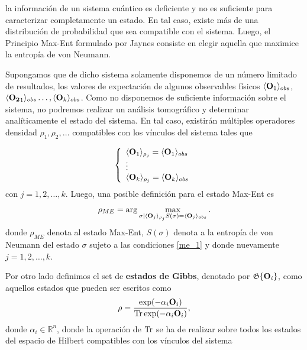 \documentclass{report} %
\newcommand{\lgg}{\langle}
\newcommand{\rgg}{\rangle}
\numberwithin{equation}{section}
\begin{document}
\begin{Omitir}
la información de un sistema cuántico es deficiente y no es suficiente para caracterizar completamente un estado. En tal caso, existe más de una distribución de probabilidad que sea compatible con el sistema. Luego, el Principio Max-Ent formulado por Jaynes consiste en elegir aquella que maximice la entropía de von Neumann.

Supongamos que de dicho sistema solamente disponemos de un número limitado de resultados, los valores de expectación de algunos observables físicos $\lgg {\bf O}_1 \rgg_{obs}$, $\lgg {\bf O_2}_1 \rgg_{obs} \ldots, \lgg {\bf O}_k \rgg_{obs}$. Como no disponemos de suficiente información sobre el sistema, no podremos realizar un análisis tomográfico y determinar analíticamente el estado del sistema. En tal caso, existirán múltiples operadores densidad  $\rho_1, \rho_2, \ldots$ compatibles con los vínculos del sistema tales que 

\begin{align}
\left\{ \begin{array}{lcc}
          \lgg {\bf O}_1 \rgg_{\rho_j} = \lgg {\bf O}_1 \rgg_{obs}  \\
          \vdots     \\ 
          \lgg {\bf O}_k \rgg_{\rho_j} = \lgg {\bf O}_k\rgg_{obs}  \\ 
             \end{array}
\right.
\label{me_1}
\end{align}
con $j=1,2,\ldots,k$. Luego, una posible definición para el estado Max-Ent es 
\begin{equation}
   \rho_{ME} = \arg\max_{\sigma | \lgg {\bf O}_j \rgg_{\rho_j} S(\sigma)= \lgg {\bf O}_j \rgg_{obs}}. 
    \label{max-ent_def1}
\end{equation}
donde $\rho_{ME}$ denota al estado Max-Ent, $S(\sigma)$ denota a la entropía de von Neumann del estado $\sigma$ sujeto a las condiciones \eqref{me_1}  y donde nuevamente $j=1,2,\ldots,k$.

Por otro lado definimos el set de \textbf{estados de Gibbs}, denotado por $\mathfrak{G}\{{\bf O}_i\}$,  como aquellos estados que pueden ser escritos como 
\begin{equation}
    \rho = \frac{\exp(-\alpha_i {\bf O}_i)}{\Tr \exp(-\alpha_i {\bf O}_i)}, 
    \label{Gibbs_state}
\end{equation}
\noindent donde $\alpha_i \in \mathds{R}^n$, donde la operación de $\Tr$ se ha de realizar sobre todos los estados del espacio de Hilbert compatibles con los vínculos del sistema 
\end{Omitir}
\end{document}
